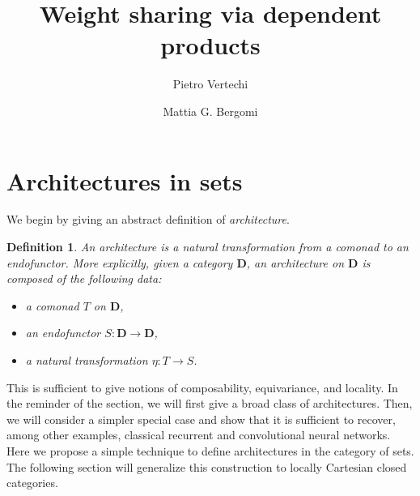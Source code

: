 \documentclass[12pt]{article}
\title{Weight sharing via dependent products}
\author{
    Pietro Vertechi \and Mattia G. Bergomi
}
\date{}
\newtheorem{definition}{Definition}
\newcommand{\pietro}[1]{\textcolor{teal}{#1}}
\newcommand{\DCat}{{\mathbf{D}}}
\begin{document}
\maketitle
\begin{abstract}
\end{abstract}

\section{Architectures in sets}

We begin by giving an abstract definition of {\em architecture}.

\begin{definition}\label{def:architecture}
    An {\em architecture} is a natural transformation from a comonad to an endofunctor. More explicitly, given a category $\DCat$, an {\em architecture} on $\DCat$ is composed of the following data:
    \begin{itemize}
        \item a comonad $T$ on $\DCat$,
        \item an endofunctor $S \colon \DCat \rightarrow \DCat$,
        \item a natural transformation $\eta \colon T \rightarrow S$.
    \end{itemize}
\end{definition}

This is sufficient to give notions of composability, equivariance, and locality. In the reminder of the section, we will first give a broad class of architectures. Then, we will consider a simpler special case and show that it is sufficient to recover, among other examples, classical recurrent and convolutional neural networks. Here we propose a simple technique to define architectures in the category of sets. The following section will generalize this construction to locally Cartesian closed categories.
\end{document}

